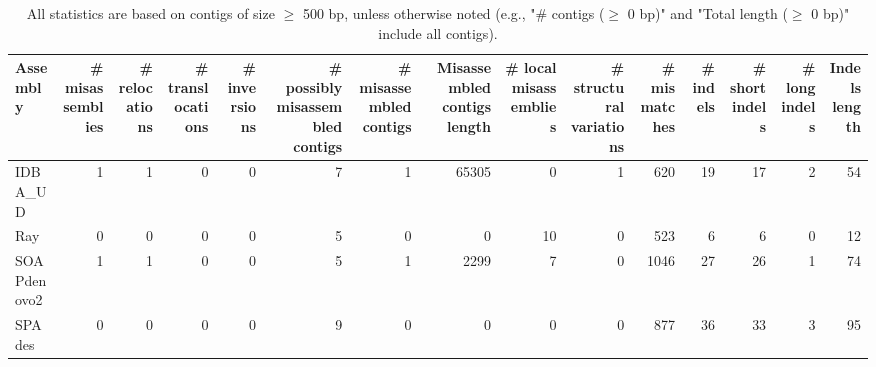 \documentclass[12pt,a4paper]{article}
\begin{document}
\begin{table}[ht]
\begin{center}
\caption{All statistics are based on contigs of size $\geq$ 500 bp, unless otherwise noted (e.g., "\# contigs ($\geq$ 0 bp)" and "Total length ($\geq$ 0 bp)" include all contigs).}
\begin{tabular}{|l*{14}{|r}|}
\hline
Assembly & \# misassemblies &     \# relocations &     \# translocations &     \# inversions & \# possibly misassembled contigs & \# misassembled contigs & Misassembled contigs length & \# local misassemblies & \# structural variations & \# mismatches & \# indels &     \# short indels &     \# long indels & Indels length \\ \hline
IDBA\_UD & 1 & 1 & 0 & 0 & 7 & 1 & 65305 & 0 & 1 & 620 & 19 & 17 & 2 & 54 \\ \hline
Ray & 0 & 0 & 0 & 0 & 5 & 0 & 0 & 10 & 0 & 523 & 6 & 6 & 0 & 12 \\ \hline
SOAPdenovo2 & 1 & 1 & 0 & 0 & 5 & 1 & 2299 & 7 & 0 & 1046 & 27 & 26 & 1 & 74 \\ \hline
SPAdes & 0 & 0 & 0 & 0 & 9 & 0 & 0 & 0 & 0 & 877 & 36 & 33 & 3 & 95 \\ \hline
\end{tabular}
\end{center}
\end{table}
\end{document}
